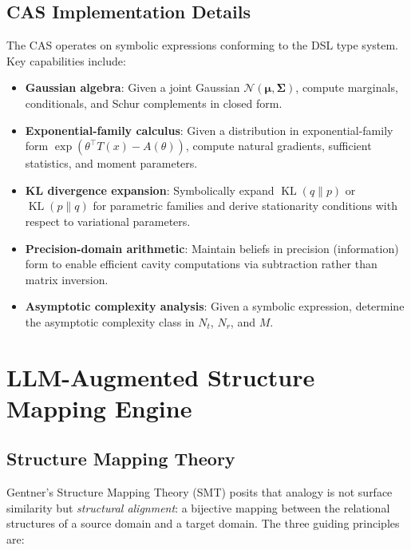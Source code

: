 \documentclass[12pt,a4paper]{article}
\newcommand{\bmu}{\bm{\mu}}
\newcommand{\bSigma}{\bm{\Sigma}}
\newcommand{\calN}{\mathcal{N}}
\DeclareMathOperator{\KL}{KL}
\begin{document}
\subsection{CAS Implementation Details}

The CAS operates on symbolic expressions conforming to the DSL type system.
Key capabilities include:
\begin{itemize}[itemsep=0pt]
  \item \textbf{Gaussian algebra}: Given a joint Gaussian
        $\calN(\bmu,\bSigma)$, compute marginals, conditionals, and Schur
        complements in closed form.
  \item \textbf{Exponential-family calculus}: Given a distribution in
        exponential-family form $\exp(\theta^\top T(x)-A(\theta))$, compute
        natural gradients, sufficient statistics, and moment parameters.
  \item \textbf{KL divergence expansion}: Symbolically expand
        $\KL(q\|p)$ or $\KL(p\|q)$ for parametric families and derive
        stationarity conditions with respect to variational parameters.
  \item \textbf{Precision-domain arithmetic}: Maintain beliefs in precision
        (information) form to enable efficient cavity computations via
        subtraction rather than matrix inversion.
  \item \textbf{Asymptotic complexity analysis}: Given a symbolic expression,
        determine the asymptotic complexity class in $N_t$, $N_r$, and $M$.
\end{itemize}

\section{LLM-Augmented Structure Mapping Engine}
\label{sec:sme}

\subsection{Structure Mapping Theory}

Gentner's Structure Mapping Theory (SMT) \cite{gentner1983} posits that
analogy is not surface similarity but \emph{structural alignment}: a bijective
mapping between the relational structures of a source domain and a target
domain.  The three guiding principles are:
\end{document}

